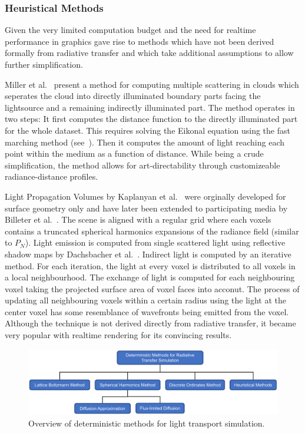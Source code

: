 \subsubsection*{Heuristical Methods}

Given the very limited computation budget and the need for realtime performance in graphics gave rise to methods which have not been derived formally from radiative transfer and which take additional assumptions to allow further simplification.

Miller et al.~\cite{Miller12} present a method for computing multiple scattering in clouds which seperates the cloud into directly illuminated boundary parts facing the lightsource and a remaining indirectly illuminated part. The method operates in two steps: It first computes the distance function to the directly illuminated part for the whole dataset. This requires solving the Eikonal equation using the fast marching method (see~\cite{Tsitsiklis95}). Then it computes the amount of light reaching each point within the medium as a function of distance. While being a crude simplification, the method allows for art-directability through customizeable radiance-distance profiles.

Light Propagation Volumes by Kaplanyan et al.~\cite{Kaplanyan10} were orginally developed for surface geometry only and have later been extended to participating media by Billeter et al.~\cite{Billeter12}. The scene is aligned with a regular grid where each voxels contains a truncated spherical harmonics expansions of the radiance field (similar to $P_N$). Light emission is computed from single scattered light using reflective shadow maps by Dachsbacher et al.~\cite{Dachsbacher05}. Indirect light is computed by an iterative method. For each iteration, the light at every voxel is distributed to all voxels in a local neighbourhood. The exchange of light is computed for each neighbouring voxel taking the projected surface area of voxel faces into acconut. The process of updating all neighbouring voxels within a certain radius using the light at the center voxel has some resemblance of wavefronts being emitted from the voxel. Although the technique is not derived directly from radiative transfer, it became very popular with realtime rendering for its convincing results.


\begin{figure}[t]
\centering
\includegraphics[width=1.0\textwidth]{03_foundations_of_light_transport_simulation/figures/fig_overview_methods.pdf}
\caption{Overview of deterministic methods for light transport simulation.}
\label{fig:rte_change_L_all}
\end{figure}

